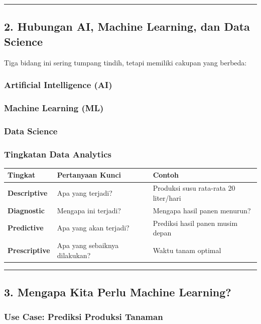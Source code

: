\documentclass[12pt,a4paper]{article}
\begin{document}
\hrule


\subsection{2. Hubungan AI, Machine Learning, dan Data Science}

Tiga bidang ini sering tumpang tindih, tetapi memiliki cakupan yang berbeda:


\subsubsection{Artificial Intelligence (AI)}

\subsubsection{Machine Learning (ML)}

\subsubsection{Data Science}

\subsubsection{Tingkatan Data Analytics}

\begin{tabular}{|l|l|l|}
\hline
Tingkat & Pertanyaan Kunci & Contoh \\
\hline
\textbf{Descriptive} & Apa yang terjadi? & Produksi susu rata-rata 20 liter/hari \\
\hline
\textbf{Diagnostic} & Mengapa ini terjadi? & Mengapa hasil panen menurun? \\
\hline
\textbf{Predictive} & Apa yang akan terjadi? & Prediksi hasil panen musim depan \\
\hline
\textbf{Prescriptive} & Apa yang sebaiknya dilakukan? & Waktu tanam optimal \\
\hline
\end{tabular}


\hrule


\subsection{3. Mengapa Kita Perlu Machine Learning?}

\subsubsection{Use Case: Prediksi Produksi Tanaman}
\end{document}
